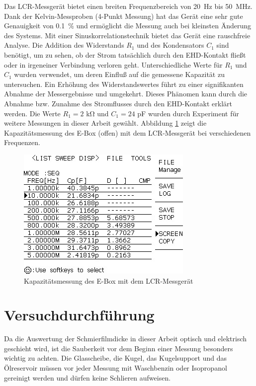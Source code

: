Das LCR-Messgerät bietet einen breiten Frequenzbereich von \SI{20}{\Hz} bis \SI{50}{\MHz}.
Dank der Kelvin-Messproben (4-Punkt Messung) hat das Gerät eine sehr gute Genauigkeit von \SI{0.1}{\percent} und ermöglicht die Messung auch bei kleinsten Änderung des Systems.
Mit einer Sinuskorrelationstechnik bietet das Gerät eine rauschfreie Analyse.
Die Addition des Widerstands $R_1$ und des Kondensators $C_1$ sind benötigt, um zu sehen, ob der Strom tatsächlich durch den EHD-Kontakt fließt oder in irgeneiner Verbindung verloren geht.
Unterschiedliche Werte für $R_1$ und $C_1$ wurden verwendet, um deren Einfluß auf die gemessene Kapazität zu untersuchen.
Ein Erhöhung des Widerstandswertes führt zu einer signifikanten Abnahme der Messergebnisse und umgekehrt.
Dieses Phänomen kann durch die Abnahme bzw. Zunahme des Stromflusses durch den EHD-Kontakt erklärt werden.
Die Werte $R_1 = 2$ \si{\kilo\ohm} und $C_1 = 24$ \si{\pico\farad} wurden durch Experiment für weitere Messungen in dieser Arbeit gewählt.
Abbildung \ref{fig:lcr_ebox_capacitance} zeigt die Kapazitätsmessung des E-Box (offen) mit dem LCR-Messgerät bei verschiedenen Frequenzen.
\begin{figure}[htb]
    \centering
    \includegraphics[width=0.5\linewidth]{./images/lcr_ebox_capacitance.jpg}
    \caption{Kapazitätsmessung des E-Box mit dem LCR-Messgerät}
    \label{fig:lcr_ebox_capacitance}
\end{figure}

\section{Versuchdurchführung}
\label{sec:versuchdurchfuehrung}

Da die Auswertung der Schmierfilmdicke in dieser Arbeit optisch und elektrisch geschieht wird, ist die Sauberkeit vor dem Beginn einer Messung besonders wichtig zu achten.
Die Glasscheibe, die Kugel, das Kugelsupport und das Ölreservoir müssen vor jeder Messung mit Waschbenzin oder Isopropanol gereinigt werden und dürfen keine Schlieren aufweisen.

